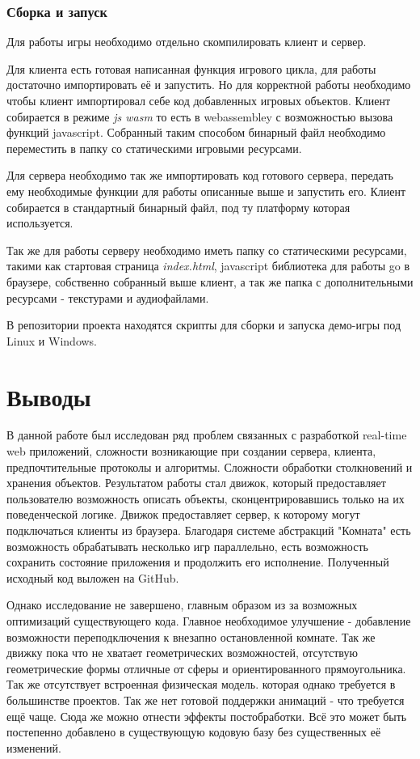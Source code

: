 \documentclass[a4paper,14pt, openany]{book}
\begin{document}
\subsection{Сборка и запуск}

Для работы игры необходимо отдельно скомпилировать клиент и сервер. 

Для клиента есть готовая написанная функция игрового цикла, для работы достаточно импортировать её и запустить. Но для корректной работы необходимо чтобы клиент импортировал себе код  добавленных игровых объектов. Клиент собирается в режиме \textit{js wasm} то есть в webassembley с возможностью вызова функций javascript. Собранный таким способом бинарный файл необходимо переместить в папку со статическими игровыми ресурсами.

Для сервера необходимо так же импортировать код готового сервера, передать ему необходимые функции для работы описанные выше и запустить его. Клиент собирается в стандартный бинарный файл, под ту платформу которая используется.

Так же для работы серверу необходимо иметь папку со статическими ресурсами, такими как стартовая страница \textit{index.html}, javascript библиотека для работы go в браузере, собственно собранный выше клиент, а так же папка с дополнительными ресурсами - текстурами и аудиофайлами.

В репозитории проекта находятся скрипты для сборки и запуска демо-игры под Linux и Windows. 


\chapter{Выводы}

В данной работе был исследован ряд проблем связанных с разработкой real-time web приложений, сложности возникающие при создании сервера, клиента, предпочтительные протоколы и алгоритмы. Сложности обработки столкновений и хранения объектов. Результатом работы стал движок, который предоставляет пользователю возможность описать объекты, сконцентрировавшись только на их поведенческой логике. Движок предоставляет сервер, к которому могут подключаться клиенты из браузера. Благодаря системе абстракций "Комната" есть возможность обрабатывать несколько игр параллельно, есть возможность сохранить состояние приложения и продолжить его исполнение. Полученный исходный код выложен на GitHub.

Однако исследование не завершено, главным образом из за возможных оптимизаций существующего кода. Главное необходимое улучшение - добавление возможности переподключения к внезапно остановленной комнате. Так же движку пока что не хватает геометрических возможностей, отсутствую геометрические формы отличные от сферы и ориентированного прямоугольника. Так же отсутствует встроенная физическая модель. которая однако требуется в большинстве проектов. Так же нет готовой поддержки анимаций - что требуется ещё чаще. Сюда же можно отнести эффекты постобработки. Всё это может быть постепенно добавлено в существующую кодовую базу без существенных её изменений.




\end{document}
